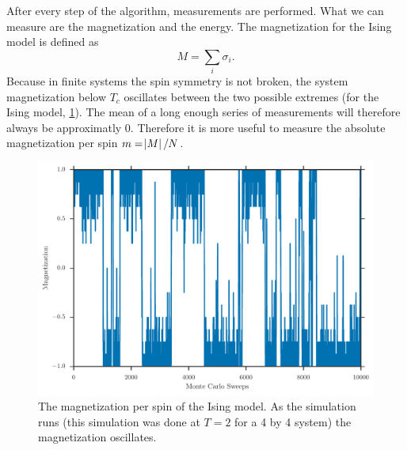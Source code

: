 \documentclass[11pt, a4paper]{report} %
\begin{document}
After every step of the algorithm, measurements are performed.
What we can measure are the magnetization and the energy.
The magnetization for the Ising model is defined as
\begin{equation}
	M = \sum_i \sigma_i.
\end{equation}
Because in finite systems the spin symmetry is not broken, the system magnetization below \(T_c\) oscillates between the two possible extremes (for the Ising model, \cref{fig:ising_4by4_magnetization_history}).
The mean of a long enough series of measurements will therefore always be approximatly 0.
Therefore it is more useful to measure the absolute magnetization per spin \(m = \abs{M} / N\).
\begin{figure}
	\includegraphics[width=\textwidth]{ising_4by4_magnetization_history.pdf}
	\caption{The magnetization per spin of the Ising model. As the simulation runs (this simulation was done at \(T=2\) for a 4 by 4 system) the magnetization oscillates.}
	\label{fig:ising_4by4_magnetization_history}
\end{figure}
\end{document}

